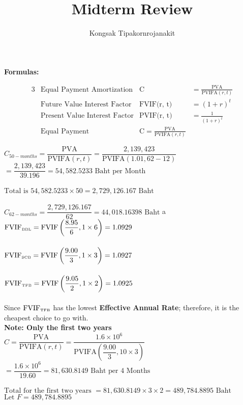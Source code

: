 \documentclass{article}
\begin{document}
\title{Midterm Review}
\author{Kongsak Tipakornrojanakit}
\date{}
\maketitle


\textbf{Formulas:}


\begin{alignat}{3}
	\label{EPA}		&\mbox{Equal Payment Amortization} 		&\mbox{C} 			&=  \frac{\mbox{PVA}}{\mbox{PVIFA}(r, t)}\\
	\label{FVIF}	&\mbox{Future Value Interest Factor} 	&\mbox{FVIF(r, t)} 	&=  (1 + r)^t\\ 
	\label{PVIF}	&\mbox{Present Value Interest Factor} 	&\mbox{PVIF(r, t)} 	&=  \frac{1}{(1 + r)^t}\\ 
	&\mbox{Equal Payment }  &\mbox{C} =  \frac{\mbox{PVA}}{\mbox{PVIFA}(r, t)}
\end{alignat}







\begin{outline}[enumerate]
\1 
	\2 
		$ C_{50-months} = \dfrac{\mbox{PVA}}{\mbox{PVIFA}(r, t)} = \dfrac{2,139,423}{\mbox{PVIFA}\left(1.01, 62 - 12 \right)} $
		$ 	= \dfrac{2,139,423}{39.196} = 54,582.5233 \mbox{ Baht per Month}$ \\\\
		$\mbox{Total is } 54,582.5233 \times 50 = 2,729,126.167 \mbox{ Baht}$ \\\\
		$ C_{62-months} = \dfrac{2,729,126.167}{62} = 44,018.16398 \mbox{ Baht} $
	\2 a
\1
	\2 	$\mbox{FVIF}_{\tiny\mbox{BBL}} = \mbox{FVIF}\left(\dfrac{8.95}{6}, 1 \times 6\right) = 1.0929$ \\\\
		$\mbox{FVIF}_{\tiny\mbox{SCB}} = \mbox{FVIF}\left(\dfrac{9.00}{3}, 1 \times 3\right) = 1.0927$ \\\\
		$\mbox{FVIF}_{\tiny\mbox{TFB}} = \mbox{FVIF}\left(\dfrac{9.05}{2}, 1 \times 2\right) = 1.0925$ \\\\
		Since $\mbox{FVIF}_{\tiny\mbox{TFB}}$ has the lowest \textbf{Effective Annual Rate}; therefore, it is the cheapest choice to go with.\\

	\2 \textbf{Note: Only the first two years }\\
		$ C = \dfrac{\mbox{PVA}}{\mbox{PVIFA}(r, t)} = \dfrac{1.6 \times 10^6}{\mbox{PVIFA}\left(\dfrac{9.00}{3}, 10 \times 3 \right)} $
		$ 	= \dfrac{1.6 \times 10^6}{19.60} =  81,630.8149 \mbox{ Baht per 4 Months}$\\\\
		$\mbox{Total for the first two years } = 81,630.8149 \times 3 \times 2 = 489,784.8895 \mbox{ Baht} $
		$\mbox{Let } F = 489,784.8895$
		
		
		
\end{outline}
\end{document}
